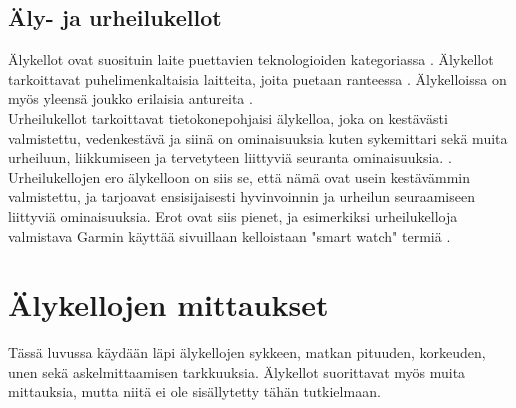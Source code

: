 \documentclass[utf8,bachelor,finnish]{bachelor}
\begin{document}
  \section{Äly- ja urheilukellot}
  Älykellot ovat suosituin laite puettavien teknologioiden kategoriassa \parencite{godfrey2018z}.
   Älykellot tarkoittavat puhelimenkaltaisia laitteita, joita puetaan ranteessa \parencite{Gregersen_watch_2023}.
    Älykelloissa on myös yleensä joukko erilaisia antureita \parencite{rawassizadeh_wearables_2014}.\\

  Urheilukellot tarkoittavat tietokonepohjaisi älykelloa, joka on kestävästi valmistettu, vedenkestävä ja siinä on ominaisuuksia kuten
    sykemittari sekä muita urheiluun, liikkumiseen ja tervetyteen liittyviä seuranta ominaisuuksia. \parencite{sportswatch_tfd}. Urheilukellojen ero älykelloon on siis se,
     että nämä ovat usein kestävämmin valmistettu, ja tarjoavat ensisijaisesti hyvinvoinnin ja urheilun seuraamiseen liittyviä ominaisuuksia. Erot ovat siis pienet, 
      ja esimerkiksi urheilukelloja valmistava Garmin käyttää sivuillaan kelloistaan "smart watch" termiä \parencite{garmin_site}. \\
  
  \chapter{Älykellojen mittaukset}
  Tässä luvussa käydään läpi älykellojen sykkeen, matkan pituuden, korkeuden, unen sekä askelmittaamisen tarkkuuksia.
   Älykellot suorittavat myös muita mittauksia, mutta niitä ei ole sisällytetty tähän tutkielmaan.\\
\end{document}
